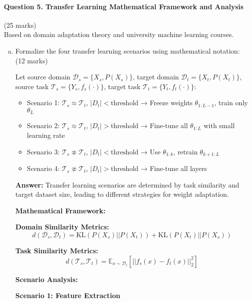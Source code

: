 \documentclass[12pt]{article}
\newcommand{\answer}[1]{{\color{answercolor}\textbf{Answer:} #1}}
\newcommand{\explanation}[1]{{\color{explanationcolor}#1}}
\begin{document}
\newpage
\paragraph{Question 5. Transfer Learning Mathematical Framework and Analysis}{{\hfill (25 marks)}}\\
Based on domain adaptation theory and university machine learning courses.

\begin{enumerate}[(a)]
    \item Formalize the four transfer learning scenarios using mathematical notation: \hfill (12 marks)
    
    Let source domain $\mathcal{D}_s = \{X_s, P(X_s)\}$, target domain $\mathcal{D}_t = \{X_t, P(X_t)\}$, source task $\mathcal{T}_s = \{Y_s, f_s(\cdot)\}$, target task $\mathcal{T}_t = \{Y_t, f_t(\cdot)\}$:
    
    \begin{itemize}
        \item Scenario 1: $\mathcal{T}_s \approx \mathcal{T}_t$, $|D_t| < \text{threshold}$ → Freeze weights $\theta_{1:L-1}$, train only $\theta_L$
        \item Scenario 2: $\mathcal{T}_s \approx \mathcal{T}_t$, $|D_t| > \text{threshold}$ → Fine-tune all $\theta_{1:L}$ with small learning rate
        \item Scenario 3: $\mathcal{T}_s \not\approx \mathcal{T}_t$, $|D_t| < \text{threshold}$ → Use $\theta_{1:k}$, retrain $\theta_{k+1:L}$
        \item Scenario 4: $\mathcal{T}_s \not\approx \mathcal{T}_t$, $|D_t| > \text{threshold}$ → Fine-tune all layers
    \end{itemize}
    
    \answer{Transfer learning scenarios are determined by task similarity and target dataset size, leading to different strategies for weight adaptation.}
    
    \explanation{
    \textbf{Mathematical Framework:}
    
    \textbf{Domain Similarity Metrics:}
    $$d(\mathcal{D}_s, \mathcal{D}_t) = \text{KL}(P(X_s) || P(X_t)) + \text{KL}(P(X_t) || P(X_s))$$
    
    \textbf{Task Similarity Metrics:}
    $$d(\mathcal{T}_s, \mathcal{T}_t) = \mathbb{E}_{x \sim \mathcal{D}_t}[||f_s(x) - f_t(x)||_2^2]$$
    
    \textbf{Scenario Analysis:}
    
    \textbf{Scenario 1: Feature Extraction}
    
}
\end{enumerate}
\end{document}
